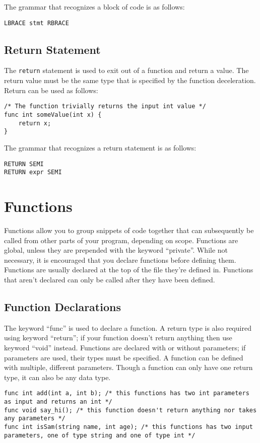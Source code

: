 \documentclass{article}
\begin{document}
The grammar that recognizes a block of code is as follows:
\begin{Verbatim}[frame=single]
LBRACE stmt RBRACE
\end{Verbatim}

\subsection{Return Statement}
The \texttt{return} statement is used to exit out of a function and return a value.  The return value must be the same type that is specified by the function deceleration.  Return can be used as follows:

\begin{lstlisting}
/* The function trivially returns the input int value */
func int someValue(int x) {
	return x;
}
\end{lstlisting}

The grammar that recognizes a return statement is as follows:
\begin{Verbatim}[frame=single]
RETURN SEMI
RETURN expr SEMI
\end{Verbatim}

\section{Functions}
Functions allow you to group snippets of code together that can subsequently be called from other parts of your program, depending on scope. Functions are global, unless they are prepended with the keyword ``private''. While not necessary, it is encouraged that you declare functions before defining them. Functions are usually declared at the top of the file they're defined in. Functions that aren't declared can only be called after they have been defined. 

\subsection{Function Declarations}

The keyword ``func'' is used to declare a function. A return type is also required using keyword ``return''; if your function doesn't return anything then use keyword ``void'' instead.  Functions are declared with or without parameters; if parameters are used, their types must be specified. A function can be defined with multiple, different parameters. Though a function can only have one return type, it can also be any data type. 

\begin{lstlisting}
func int add(int a, int b); /* this functions has two int parameters as input and returns an int */
func void say_hi(); /* this function doesn't return anything nor takes any parameters */
func int isSam(string name, int age); /* this functions has two input parameters, one of type string and one of type int */

\end{lstlisting}
\end{document}
